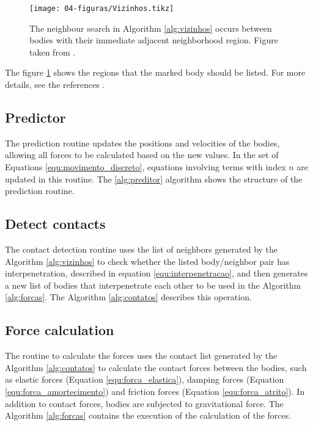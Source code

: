 

\begin{figure}
    \centering
    \texttt{[image: 04-figuras/Vizinhos.tikz]}
    \caption[Neighbor search.]{The neighbour search in Algorithm \ref{alg:vizinhos} occurs between bodies with their immediate adjacent neighborhood region. Figure taken from \cite{Dissertacao}.}
    \label{fig:vizinhos}
\end{figure}

    The figure \ref{fig:vizinhos} shows the regions that the marked body should be listed. For more details, see the references \cite{Dissertacao, Computer_Simulation_of_Liquids}. 

\subsection{Predictor}
    The prediction routine updates the positions and velocities of the bodies, allowing all forces to be calculated based on the new values. In the set of Equations \ref{equ:movimento_discreto}, equations involving terms with index $n$ are updated in this routine. The \ref{alg:preditor} algorithm shows the structure of the prediction routine.



\subsection{Detect contacts}
    The contact detection routine uses the list of neighbors generated by the Algorithm \ref{alg:vizinhos} to check whether the listed body/neighbor pair has interpenetration, described in equation \ref{equ:interpenetracao}, and then generates a new list of bodies that interpenetrate each other to be used in the Algorithm \ref{alg:forcas}. The Algorithm \ref{alg:contatos} describes this operation.



\subsection{Force calculation}
    The routine to calculate the forces uses the contact list generated by the Algorithm \ref{alg:contatos} to calculate the contact forces between the bodies, such as elastic forces (Equation \ref{equ:forca_elastica}), damping forces (Equation \ref{equ:forca_amortecimento}) and friction forces (Equation \ref{equ:forca_atrito}). In addition to contact forces, bodies are subjected to gravitational force. The Algorithm \ref{alg:forcas} contains the execution of the calculation of the forces. 


